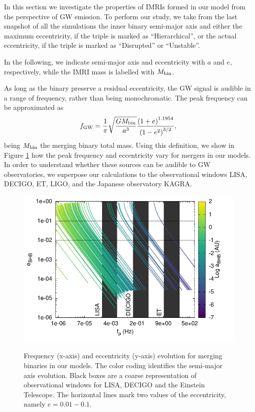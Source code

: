 \documentclass[twocolumn]{aastex62}
\newcommand{\gw}{{\rm GW}}
\begin{document}
In this section we investigate the properties of IMRIs formed in our model from the perspective of GW emission. To perform our study, we take from the last snapshot of all the simulations the inner binary semi-major axis and either the maximum eccentricity, if the triple is marked as ``Hierarchical'', or the actual eccentricity, if the triple is marked as ``Disrupted'' or ``Unstable''.

In the following, we indicate semi-major axis and eccentricity with $a$ and $e$, respectively, while the IMRI mass is labelled with $M_{\rm bin}$.

As long as the binary preserve a residual eccentricity, the GW signal is audible in a range of frequency, rather than being monochromatic. The peak frequency can be approximated as \citep{wen03, antonini12}
\begin{equation}
f_\gw = \frac{1}{\pi}\sqrt{\frac{GM_{\rm bin}}{a^3}}\frac{\left(1+e\right)^{1.1954}}{\left(1-e^2\right)^{3/2}},
\end{equation}  
being $M_{\rm bin}$ the merging binary total mass. Using this definition, we show in Figure \ref{F10} how the peak frequency and eccentricity vary for mergers in our models. In order to understand whether these sources can be audible to GW observatories, we superpose our calculations to the observational windows LISA, DECIGO, ET, LIGO, and the Japanese observatory KAGRA.

\begin{figure}
\centering
\includegraphics[width=\columnwidth]{freq_evo}\\
\caption{Frequency (x-axis) and eccentricity (y-axis) evolution for merging binaries in our models. The color coding identifies the semi-major axis evolution. Black boxes are a coarse representation of observational windows for LISA, DECIGO and the Einstein Telescope. The horizontal lines mark two values of the eccentricity, namely $e=0.01-0.1$.}
\label{F10}
\end{figure}
\end{document}
